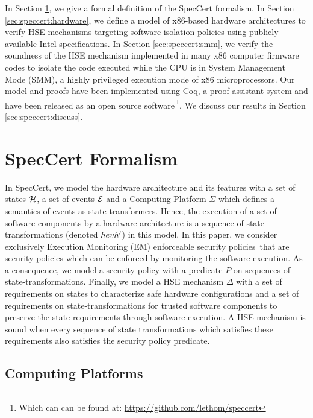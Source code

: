 In Section \ref{sec:speccert:framework}, we give a formal definition of the
SpecCert formalism.
%
In Section \ref{sec:speccert:hardware}, we define a model of x86-based hardware
architectures to verify HSE mechanisms targeting software isolation policies
using publicly available Intel specifications.
%
In Section \ref{sec:speccert:smm}, we verify the soundness of the HSE mechanism
implemented in many x86 computer firmware codes to isolate the code executed
while the CPU is in System Management Mode (SMM), a highly privileged execution
mode of x86 microprocessors.
%
Our model and proofs have been implemented using Coq, a proof assistant system
and have been released as an open source software\,\footnote{Which can can be
  found at: \url{https://github.com/lethom/speccert}}.
%
We discuss our results in Section \ref{sec:speccert:discuss}.

\section{SpecCert Formalism} \label{sec:speccert:framework}

In SpecCert, we model the hardware architecture and its features with a set of
states $\mathcal{H}$, a set of events $\mathcal{E}$ and a Computing Platform $\Sigma$
which defines a semantics of events as state-transformers. Hence, the execution
of a set of software components by a hardware architecture is a sequence of
state-transformations (denoted $\transitionLTS{Ez}{h}{ev}{h'}$) in this model.
In this paper, we consider exclusively Execution Monitoring (EM) enforceable
security policies\,\cite{schneider2000enforceable,basin2013enforceable} that are
security policies which can be enforced by monitoring the software execution. As
a consequence, we model a security policy with a predicate $P$ on sequences of
state-transformations.  Finally, we model a HSE mechanism $\Delta$ with a set of
requirements on states to characterize safe hardware configurations and a set of
requirements on state-transformations for trusted software components to
preserve the state requirements through software execution. A HSE mechanism is
sound when every sequence of state transformations which satisfies these
requirements also satisfies the security policy predicate.

\subsection{Computing Platforms} \label{subsec:speccert:computing}

